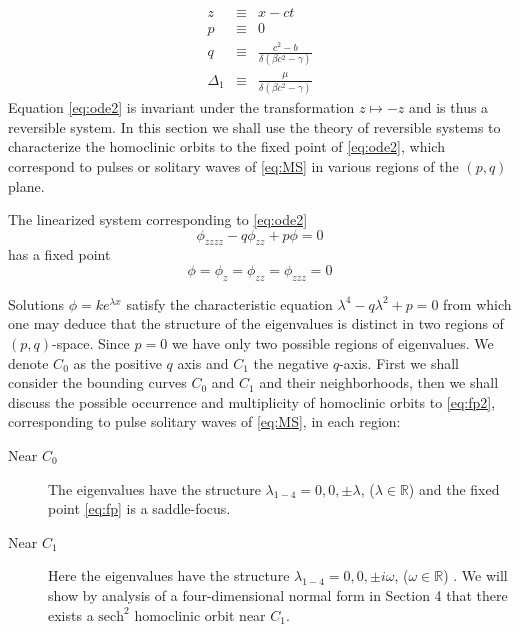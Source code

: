 \begin{subequations}
\begin{eqnarray}
z &\equiv& x - c t\\
p &\equiv& 0\label{eq:pdef} \\
q &\equiv & \frac{c^2 - b}{\delta\left(\beta c^2 - \gamma\right)} 
\label{eq:qdef2} \\
\Delta_1 &\equiv& \frac{\mu}{ \delta\left( \beta c^2 - \gamma\right) }\label{eq:deltadef} 
\end{eqnarray}
\end{subequations}
Equation \eqref{eq:ode2} is invariant under the transformation $ z \mapsto -z $ and is thus a reversible system. In this section we shall
use the theory of reversible systems to characterize the homoclinic orbits to the fixed point of \eqref{eq:ode2}, which correspond to pulses
or solitary waves of \eqref{eq:MS} in various regions of the $(p,q)$ plane.

The linearized system corresponding to \eqref{eq:ode2}
\begin{equation}
 \label{eq:linode2} \phi_{zzzz} - q \phi_{zz} + p \phi = 0
\end{equation}
has a fixed point \begin{equation}\label{eq:fp2} \phi = \phi_z = \phi_{zz} = \phi_{zzz} = 0 \end{equation}

Solutions $\phi = k e^{\lambda x}$ satisfy the characteristic equation
$\lambda^4 - q \lambda^2 + p = 0 $ from which one may deduce that the structure
of the eigenvalues is distinct in two regions of $\left(p,q\right)$-space.
Since $p=0$ we have only two possible regions of eigenvalues.  We denote $C_0$
as the positive $q$ axis and $C_1$ the negative $q$-axis. First we shall 
consider the bounding curves $C_0$ and $C_1$ and their neighborhoods, then we shall discuss the possible
occurrence and multiplicity of homoclinic orbits to \eqref{eq:fp2}, corresponding
to pulse solitary waves of \eqref{eq:MS}, in each region:

\begin{description}
\item[Near $C_0$] 
The eigenvalues have the structure $\lambda_{1-4} = 0,0,\pm \lambda$, ($\lambda \in \mathbb{R}$) and the fixed point
\eqref{eq:fp} is a saddle-focus.
\item[Near $C_1$] 
Here the eigenvalues have the structure $\lambda_{1-4} = 0,0,\pm i \omega $, ($\omega \in \mathbb{R}$) . We will show by analysis of a
four-dimensional normal form in Section 4 that there exists a $\mathrm{sech}^2$ homoclinic orbit near $C_1$.
\end{description}

